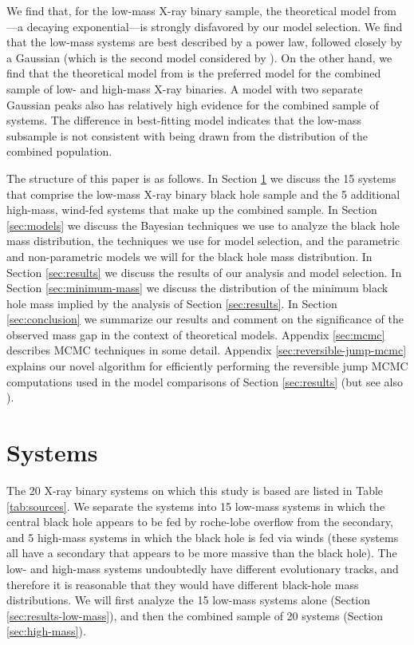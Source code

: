 \documentclass[preprint]{aastex}
\begin{document}
We find that, for the low-mass X-ray binary sample, the theoretical
model from \citet{Fryer2001}---a decaying exponential---is strongly
disfavored by our model selection.  We find that the low-mass systems
are best described by a power law, followed closely by a Gaussian
(which is the second model considered by \citet{Ozel2010}).  On the
other hand, we find that the theoretical model from \citet{Fryer2001}
is the preferred model for the combined sample of low- and high-mass
X-ray binaries.  A model with two separate Gaussian peaks also has
relatively high evidence for the combined sample of systems.  The
difference in best-fitting model indicates that the low-mass subsample
is not consistent with being drawn from the distribution of the
combined population.

The structure of this paper is as follows.  In Section
\ref{sec:systems} we discuss the 15 systems that comprise the low-mass
X-ray binary black hole sample and the 5 additional high-mass,
wind-fed systems that make up the combined sample.  In Section
\ref{sec:models} we discuss the Bayesian techniques we use to analyze
the black hole mass distribution, the techniques we use for model
selection, and the parametric and non-parametric models we will for
the black hole mass distribution.  In Section \ref{sec:results} we
discuss the results of our analysis and model selection.  In Section
\ref{sec:minimum-mass} we discuss the distribution of the minimum
black hole mass implied by the analysis of Section \ref{sec:results}.
In Section \ref{sec:conclusion} we summarize our results and comment
on the significance of the observed mass gap in the context of
theoretical models.  Appendix \ref{sec:mcmc} describes MCMC techniques
in some detail.  Appendix \ref{sec:reversible-jump-mcmc} explains our
novel algorithm for efficiently performing the reversible jump MCMC
computations used in the model comparisons of Section
\ref{sec:results} (but see also \citet{Farr2010}).

\section{Systems}
\label{sec:systems}

The 20 X-ray binary systems on which this study is based are listed in
Table \ref{tab:sources}.  We separate the systems into 15 low-mass
systems in which the central black hole appears to be fed by
roche-lobe overflow from the secondary, and 5 high-mass systems in
which the black hole is fed via winds (these systems all have a
secondary that appears to be more massive than the black hole).  The
low- and high-mass systems undoubtedly have different evolutionary
tracks, and therefore it is reasonable that they would have different
black-hole mass distributions.  We will first analyze the 15 low-mass
systems alone (Section \ref{sec:results-low-mass}), and then the
combined sample of 20 systems (Section \ref{sec:high-mass}).
\end{document}
